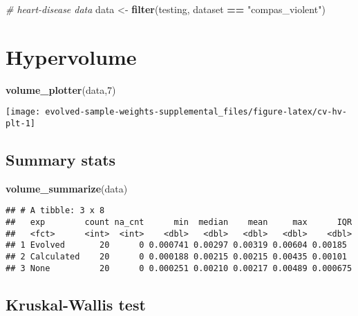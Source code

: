 \documentclass[
]{book}
\newenvironment{Shaded}{\begin{snugshade}}{\end{snugshade}}
\newcommand{\CommentTok}[1]{\textcolor[rgb]{0.56,0.35,0.01}{\textit{#1}}}
\newcommand{\DecValTok}[1]{\textcolor[rgb]{0.00,0.00,0.81}{#1}}
\newcommand{\FunctionTok}[1]{\textcolor[rgb]{0.13,0.29,0.53}{\textbf{#1}}}
\newcommand{\NormalTok}[1]{#1}
\newcommand{\OtherTok}[1]{\textcolor[rgb]{0.56,0.35,0.01}{#1}}
\newcommand{\SpecialCharTok}[1]{\textcolor[rgb]{0.81,0.36,0.00}{\textbf{#1}}}
\newcommand{\StringTok}[1]{\textcolor[rgb]{0.31,0.60,0.02}{#1}}
\begin{document}
\begin{Shaded}
\begin{Highlighting}[]
\CommentTok{\# heart{-}disease data}
\NormalTok{data }\OtherTok{\textless{}{-}} \FunctionTok{filter}\NormalTok{(testing, dataset }\SpecialCharTok{==} \StringTok{"compas\_violent"}\NormalTok{)}
\end{Highlighting}
\end{Shaded}

\hypertarget{hypervolume-6}{%
\section{Hypervolume}\label{hypervolume-6}}

\begin{Shaded}
\begin{Highlighting}[]
\FunctionTok{volume\_plotter}\NormalTok{(data,}\DecValTok{7}\NormalTok{)}
\end{Highlighting}
\end{Shaded}

\texttt{[image: evolved-sample-weights-supplemental\_files/figure-latex/cv-hv-plt-1]}

\hypertarget{summary-stats-6}{%
\subsection{Summary stats}\label{summary-stats-6}}

\begin{Shaded}
\begin{Highlighting}[]
\FunctionTok{volume\_summarize}\NormalTok{(data)}
\end{Highlighting}
\end{Shaded}

\begin{verbatim}
## # A tibble: 3 x 8
##   exp        count na_cnt      min  median    mean     max      IQR
##   <fct>      <int>  <int>    <dbl>   <dbl>   <dbl>   <dbl>    <dbl>
## 1 Evolved       20      0 0.000741 0.00297 0.00319 0.00604 0.00185 
## 2 Calculated    20      0 0.000188 0.00215 0.00215 0.00435 0.00101 
## 3 None          20      0 0.000251 0.00210 0.00217 0.00489 0.000675
\end{verbatim}

\hypertarget{kruskal-wallis-test-6}{%
\subsection{Kruskal-Wallis test}\label{kruskal-wallis-test-6}}
\end{document}
